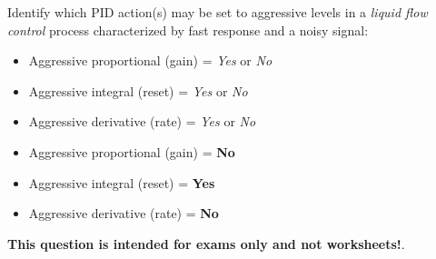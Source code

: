 

Identify which PID action(s) may be set to aggressive levels in a {\it liquid flow control} process characterized by fast response and a noisy signal:

\begin{itemize}
\item{} Aggressive proportional (gain) = {\it Yes} or {\it No}
\vskip 10pt
\item{} Aggressive integral (reset) = {\it Yes} or {\it No} 
\vskip 10pt
\item{} Aggressive derivative (rate) = {\it Yes} or {\it No} 
\end{itemize}







\begin{itemize}
\item{} Aggressive proportional (gain) = {\bf No}
\vskip 10pt
\item{} Aggressive integral (reset) = {\bf Yes} 
\vskip 10pt
\item{} Aggressive derivative (rate) = {\bf No} 
\end{itemize}







{\bf This question is intended for exams only and not worksheets!}.


